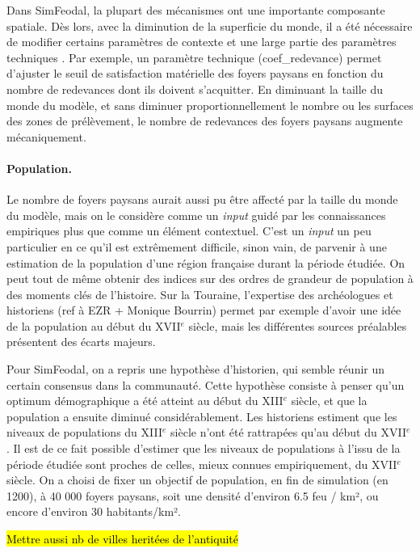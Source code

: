 Dans SimFeodal, la plupart des mécanismes ont une importante composante spatiale.
Dès lors, avec la diminution de la superficie du monde, il a été nécessaire de modifier certains paramètres de contexte et une large partie des paramètres techniques .
Par exemple, un paramètre technique (\textsf{coef\_redevance}) permet d'ajuster le seuil de satisfaction matérielle des foyers paysans en fonction du nombre de redevances dont ils doivent s'acquitter.
En diminuant la taille du monde du modèle, et sans diminuer proportionnellement le nombre ou les surfaces des zones de prélèvement, le nombre de redevances des foyers paysans augmente mécaniquement.

\paragraph{Population.}
Le nombre de foyers paysans aurait aussi pu être affecté par la taille du monde du modèle, mais on le considère comme un \textit{input} guidé par les connaissances empiriques plus que comme un élément contextuel.
C'est un \textit{input} un peu particulier en ce qu'il est extrêmement difficile, sinon vain, de parvenir à une estimation de la population d'une région française durant la période étudiée.
On peut tout de même obtenir des indices sur des ordres de grandeur de population à des moments clés de l'histoire.
Sur la Touraine, l'expertise des archéologues et historiens (ref à EZR + Monique Bourrin) permet par exemple d'avoir une idée de la population au début du XVII$^e$ siècle, mais les différentes sources préalables présentent des écarts majeurs.

Pour SimFeodal, on a repris une hypothèse d'historien, qui semble réunir un certain consensus dans la communauté.
Cette hypothèse consiste à penser qu'un optimum démographique a été atteint au début du XIII$^e$ siècle, et que la population a ensuite diminué considérablement.
Les historiens estiment que les niveaux de populations du XIII$^e$ siècle n'ont été rattrapées qu'au début du XVII$^e$.
Il est de ce fait possible d'estimer que les niveaux de populations à l'issu de la période étudiée sont proches de celles, mieux connues empiriquement, du XVII$^e$ siècle.
On a choisi de fixer un objectif de population, en fin de simulation (en 1200), à 40 000 foyers paysans, soit une densité d'environ 6.5 feu / km², ou encore d'environ 30 habitants/km².

\hl{Mettre aussi nb de villes heritées de l'antiquité}

